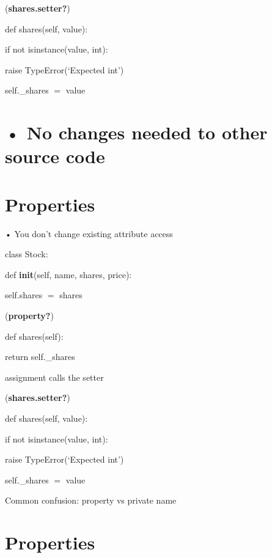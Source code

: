 \documentclass[
  letterpaper,
  DIV=11,
  numbers=noendperiod]{scrreprt}
\begin{document}
\begin{quote}
\begin{quote}
\begin{quote}
\end{quote}
\end{quote}
\end{quote}

(\textbf{shares.setter?})

def shares(self, value):

if not isinstance(value, int):

raise TypeError(`Expected int')

self.\_shares \(=\) value


\chapter{• No changes needed to other source
code}\label{no-changes-needed-to-other-source-code}


\chapter{Properties}\label{properties-2}

• You don't change existing attribute access

class Stock:

def \textbf{init}(self, name, shares, price):

self.shares \(=\) shares

(\textbf{property?})

def shares(self):

return self.\_shares

assignment calls the setter

(\textbf{shares.setter?})

def shares(self, value):

if not isinstance(value, int):

raise TypeError(`Expected int')

self.\_shares \(=\) value

Common confusion: property vs private name


\chapter{Properties}\label{properties-3}
\end{document}
